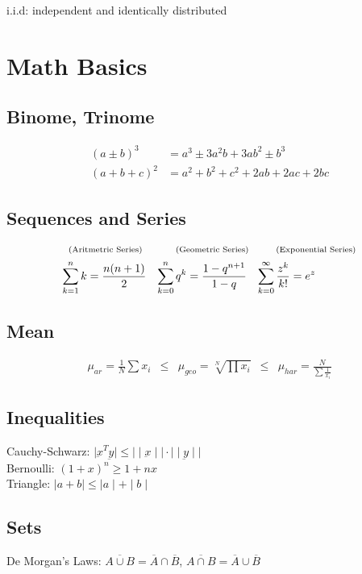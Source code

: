 \begin{mdframed}[style=redbox]
  i.i.d: independent and identically distributed
\end{mdframed}

\section{Math Basics}
\begin{mdframed}[style=eqbox]
\subsection*{Binome, Trinome}
  \begin{align*}
    (a \pm b)^3 &= a^3 \pm 3a^2b + 3ab^2 \pm b^3 \\
    (a + b + c)^2 &= a^2 + b^2 + c^2 + 2ab + 2ac + 2bc
  \end{align*}
\subsection*{Sequences and Series}
  \begin{align*}
    \shortintertext{\scriptsize{~~(Aritmetric Series) ~~~~~~~~~ (Geometric Series) ~~~~~~~ (Exponential Series)}}
    \sum_{k=1}^n k = \frac{n(n+1)}{2} && \sum_{k = 0}^n q^k = \frac{1 - q^{n+1}}{1 - q} && \sum_{k = 0}^\infty \frac{z^k}{k!} = e^z
  \end{align*}
\subsection*{Mean}
\begin{align*}
  \mu_{ar} = \frac{1}{N} \sum x_i &\leq& \mu_{geo} = \sqrt[N]{\prod x_i} &\leq& \mu_{har} = \frac{N}{\sum \frac{1}{x_i}}
\end{align*}
\subsection*{Inequalities}
Cauchy-Schwarz: $\mid \underbar{x}^T \underbar{y} \mid \leq \mid\mid \underbar{x} \mid\mid \cdot \mid\mid \underbar{y} \mid\mid$\\[0.5em]
Bernoulli: $(1 + x)^n \geq 1 + nx$\\[0.5em]
Triangle: $\mid a + b \mid \leq \mid a \mid + \mid b \mid$
\subsection*{Sets}
De Morgan's Laws: $\overline{A \cup B} = \overline{A} \cap \overline{B}$, $\overline{A \cap B} = \overline{A} \cup \overline{B}$
\end{mdframed}

